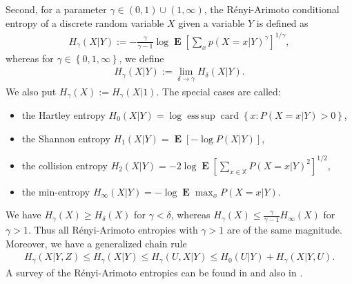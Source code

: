 \documentclass[a4paper,12pt]{article}
\newcommand{\kwad}[1]{\left[ #1 \right]}
\newcommand{\klam}[1]{\left\{ #1 \right\}}
\DeclareMathOperator{\esssup}{ess\, sup}
\DeclareMathOperator{\card}{card}
\DeclareMathOperator{\mean}{\mathbf{E}}
\begin{document}
Second, for a parameter $\gamma\in(0,1)\cup(1,\infty)$, the
R\'enyi-Arimoto conditional entropy of a discrete random variable $X$
given a variable $Y$ is defined as
\begin{align}
  \label{RenyiArimoto}
  H_\gamma(X|Y):=
  -\frac{\gamma}{\gamma-1}\log
  \mean\kwad{\sum_x p(X=x|Y)^{\gamma}}^{1/\gamma}
  ,
\end{align}
whereas for $\gamma\in\klam{0,1,\infty}$, we define
\begin{align}
  H_\gamma(X|Y):=\lim_{\delta\rightarrow\gamma} H_\delta(X|Y).
\end{align}
We also put $H_\gamma(X):=H_\gamma(X|1)$. The special cases are
called:
\begin{itemize}
\item the Hartley entropy
$H_0(X|Y)= \log \esssup\card\klam{x: P(X=x|Y)>0}$,
\item  the Shannon
entropy $H_1(X|Y)=\mean\kwad{-\log P(X|Y)}$, 
\item the collision entropy
$H_2(X|Y)=-2\log \mean\kwad{\sum_{x\in\mathbb{X}} P(X=x|Y)^2}^{1/2}$,
\item the min-entropy $H_\infty(X|Y)=-\log \mean\max_{x} P(X=x|Y)$.
\end{itemize}
We have $H_\gamma(X)\ge H_\delta(X)$ for $\gamma<\delta$, whereas
$H_\gamma(X)\le \frac{\gamma}{\gamma-1}H_\infty(X)$ for $\gamma>1$.
Thus all R\'enyi-Arimoto entropies with $\gamma>1$ are of the same
magnitude.  Moreover, we have a generalized chain rule
\begin{align}
  \label{Chain}
  H_\gamma(X|Y,Z)\le H_\gamma(X|Y)\le H_\gamma(U,X|Y)\le
  H_0(U|Y)+H_\gamma(X|Y,U).
\end{align}
A survey of the R\'enyi-Arimoto entropies can be found in
\citep{FehrBerens14} and also in \citep[Section 9.1]{Debowski21}.
\end{document}
